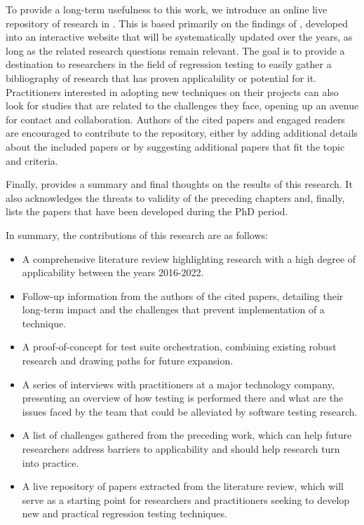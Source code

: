 To provide a long-term usefulness to this work, we introduce an online live repository of research in .
This is based primarily on the findings of , developed into an interactive website that will be systematically updated over the years, as long as the related research questions remain relevant.
The goal is to provide a destination to researchers in the field of regression testing to easily gather a bibliography of research that has proven applicability or potential for it.
Practitioners interested in adopting new techniques on their projects can also look for studies that are related to the challenges they face, opening up an avenue for contact and collaboration.
Authors of the cited papers and engaged readers are encouraged to contribute to the repository, either by adding additional details about the included papers or by suggesting additional papers that fit the topic and criteria.

Finally,  provides a summary and final thoughts on the results of this research.
It also acknowledges the threats to validity of the preceding chapters and, finally, lists the papers that have been developed during the PhD period.

In summary, the contributions of this research are as follows:
\begin{itemize}
	\item A comprehensive literature review highlighting research with a high degree of applicability between the years 2016-2022.
	\item Follow-up information from the authors of the cited papers, detailing their long-term impact and the challenges that prevent implementation of a technique.
	\item A proof-of-concept for test suite orchestration, combining existing robust research and drawing paths for future expansion.
	\item A series of interviews with practitioners at a major technology company, presenting an overview of how testing is performed there and what are the issues faced by the team that could be alleviated by software testing research.
	\item A list of challenges gathered from the preceding work, which can help future researchers address barriers to applicability and should help research turn into practice.
	\item A live repository of papers extracted from the literature review, which will serve as a starting point for researchers and practitioners seeking to develop new and practical regression testing techniques. 
\end{itemize}


